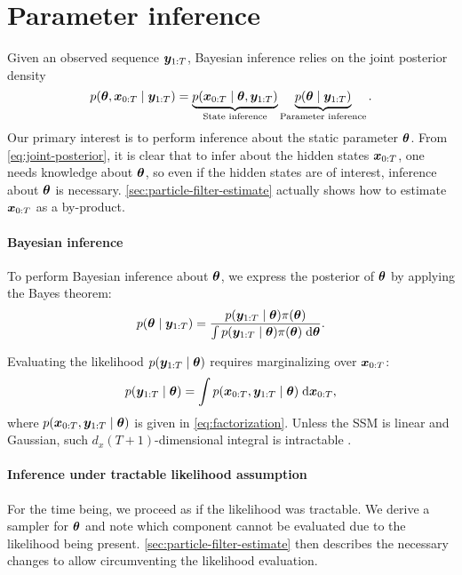 \section{Parameter inference} \label{sec:parameter-inference}
Given an observed sequence $\bm{y}_{1:T}$, Bayesian inference relies on the joint posterior density
\begin{equation}\label{eq:joint-posterior}
p(\bm{\theta}, \bm{x}_{0:T} \mid \bm{y}_{1:T}) = \underbrace{p(\bm{x}_{0:T} \mid \bm{\theta}, \bm{y}_{1:T})}_{\text{State inference}} \underbrace{p(\bm{\theta} \mid \bm{y}_{1:T})}_{\text{Parameter inference}}.
\end{equation}
Our primary interest is to perform inference about the static parameter $\bm{\theta}$. From \eqref{eq:joint-posterior}, it is clear that to infer about the hidden states $\bm{x}_{0:T}$, one needs knowledge about $\bm{\theta}$, so even if the hidden states are of interest, inference about $\bm{\theta}$ is necessary. \autoref{sec:particle-filter-estimate} actually shows how to estimate $\bm{x}_{0:T}$ as a by-product.


\paragraph{Bayesian inference}

To perform Bayesian inference about $\bm{\theta}$, we express the posterior of $\bm{\theta}$ by applying the Bayes theorem:
\begin{equation} \label{eq:posterior}
p(\bm{\theta} \mid \bm{y}_{1:T}) = \frac{p(\bm{y}_{1:T} \mid \bm{\theta}) \pi(\bm{\theta})}{\int p(\bm{y}_{1:T} \mid \bm{\theta}) \pi(\bm{\theta}) \; \mathrm{d}{\bm{\theta}}}.
\end{equation}

Evaluating the likelihood $p(\bm{y}_{1:T} \mid \bm{\theta})$ requires marginalizing over $\bm{x}_{0:T}$:
\begin{equation*}
p(\bm{y}_{1:T} \mid \bm{\theta}) = \int p(\bm{x}_{0:T}, \bm{y}_{1:T} \mid \bm{\theta}) \; \mathrm{d}{\bm{x}_{0:T}},
\end{equation*}
where $p(\bm{x}_{0:T}, \bm{y}_{1:T} \mid \bm{\theta})$ is given in \eqref{eq:factorization}. Unless the SSM is linear and Gaussian, such $d_x(T+1)$-dimensional integral is intractable \citep{andrieu}.


\paragraph{Inference under tractable likelihood assumption}

For the time being, we proceed as if the likelihood was tractable. We derive a sampler for $\bm{\theta}$ and note which component cannot be evaluated due to the likelihood being present. \autoref{sec:particle-filter-estimate} then describes the necessary changes to allow circumventing the likelihood evaluation.

